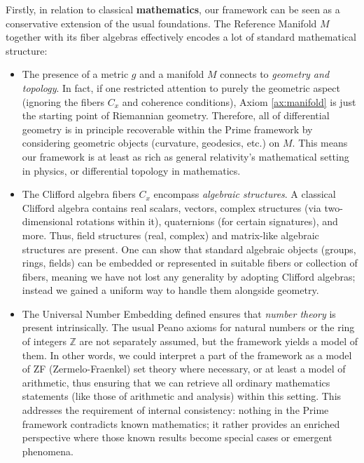 \documentclass[11pt]{article}
\begin{document}
Firstly, in relation to classical \textbf{mathematics}, our framework can be seen as a conservative extension of the usual foundations. The Reference Manifold $M$ together with its fiber algebras effectively encodes a lot of standard mathematical structure:
\begin{itemize}
    \item The presence of a metric $g$ and a manifold $M$ connects to \emph{geometry and topology}. In fact, if one restricted attention to purely the geometric aspect (ignoring the fibers $C_x$ and coherence conditions), Axiom \ref{ax:manifold} is just the starting point of Riemannian geometry. Therefore, all of differential geometry is in principle recoverable within the Prime framework by considering geometric objects (curvature, geodesics, etc.) on $M$. This means our framework is at least as rich as general relativity's mathematical setting in physics, or differential topology in mathematics.
    \item The Clifford algebra fibers $C_x$ encompass \emph{algebraic structures}. A classical Clifford algebra contains real scalars, vectors, complex structures (via two-dimensional rotations within it), quaternions (for certain signatures), and more. Thus, field structures (real, complex) and matrix-like algebraic structures are present. One can show that standard algebraic objects (groups, rings, fields) can be embedded or represented in suitable fibers or collection of fibers, meaning we have not lost any generality by adopting Clifford algebras; instead we gained a uniform way to handle them alongside geometry.
    \item The Universal Number Embedding defined ensures that \emph{number theory} is present intrinsically. The usual Peano axioms for natural numbers or the ring of integers $\mathbb{Z}$ are not separately assumed, but the framework yields a model of them. In other words, we could interpret a part of the framework as a model of ZF (Zermelo-Fraenkel) set theory where necessary, or at least a model of arithmetic, thus ensuring that we can retrieve all ordinary mathematics statements (like those of arithmetic and analysis) within this setting. This addresses the requirement of internal consistency: nothing in the Prime framework contradicts known mathematics; it rather provides an enriched perspective where those known results become special cases or emergent phenomena.
\end{itemize}
\end{document}
